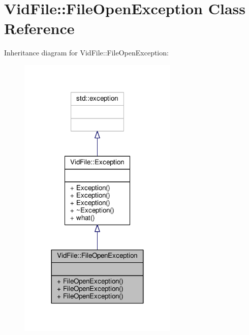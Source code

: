 \hypertarget{classVidFile_1_1FileOpenException}{}\section{Vid\+File\+:\+:File\+Open\+Exception Class Reference}
\label{classVidFile_1_1FileOpenException}


Inheritance diagram for Vid\+File\+:\+:File\+Open\+Exception\+:
\nopagebreak
\begin{figure}[H]
\begin{center}
\leavevmode
\includegraphics[width=215pt]{da/deb/classVidFile_1_1FileOpenException__inherit__graph}
\end{center}
\end{figure}


